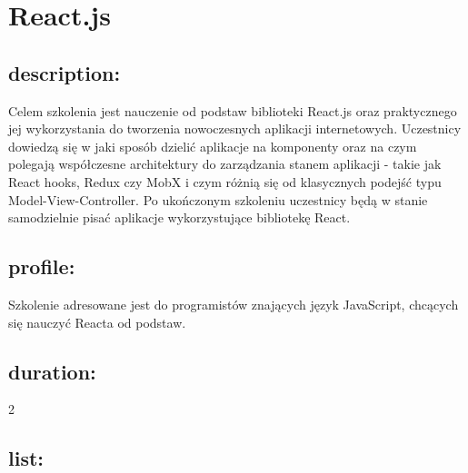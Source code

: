 \documentclass{article}[10pt]
\begin{document}
\newpage


    
	\section{React.js}

	\subsection*{description:}
	\begin{adjustwidth}{2cm}{}
		
Celem szkolenia jest nauczenie od podstaw biblioteki React.js oraz praktycznego jej wykorzystania do tworzenia nowoczesnych aplikacji internetowych. Uczestnicy dowiedzą się w jaki sposób dzielić aplikacje na komponenty oraz na czym polegają współczesne architektury do zarządzania stanem aplikacji - takie jak React hooks, Redux czy MobX i czym różnią się od klasycznych podejść  typu Model-View-Controller.
Po ukończonym szkoleniu uczestnicy będą w stanie samodzielnie pisać aplikacje wykorzystujące bibliotekę React. 
	\end{adjustwidth}
	\subsection*{profile:}
\begin{adjustwidth}{2cm}{}
	
Szkolenie adresowane jest do programistów znających język JavaScript, chcących się nauczyć Reacta od podstaw.
\end{adjustwidth}
	\subsection*{duration:}
\begin{adjustwidth}{2cm}{}
	2
\end{adjustwidth}

	\subsection*{list:}
\begin{adjustwidth}{1.5cm}{}
	\begin{itemize}





















	\end{itemize}
\end{adjustwidth}
\end{document}
